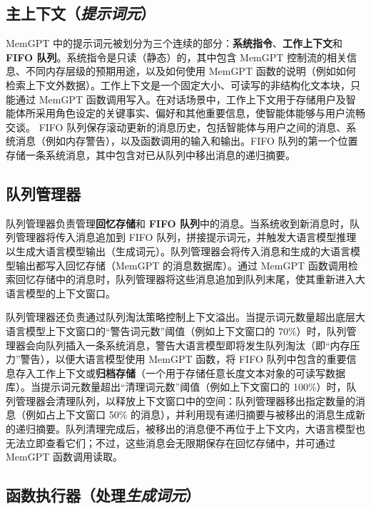 \documentclass[UTF8,fontset=fandol,a4paper,11pt]{ctexart}
\newcommand{\ours}{MemGPT\xspace}
\begin{document}
\subsection{主上下文（\emph{提示词元}）}

\ours 中的提示词元被划分为三个连续的部分：\textbf{系统指令}、\textbf{工作上下文}和 \textbf{FIFO 队列}。系统指令是只读（静态）的，其中包含 \ours 控制流的相关信息、不同内存层级的预期用途，以及如何使用 \ours 函数的说明（例如如何检索上下文外数据）。工作上下文是一个固定大小、可读写的非结构化文本块，只能通过 \ours 函数调用写入。在对话场景中，工作上下文用于存储用户及智能体所采用角色设定的关键事实、偏好和其他重要信息，使智能体能够与用户流畅交谈。
FIFO 队列保存滚动更新的消息历史，包括智能体与用户之间的消息、系统消息（例如内存警告），以及函数调用的输入和输出。FIFO 队列的第一个位置存储一条系统消息，其中包含对已从队列中移出消息的递归摘要。

\subsection{队列管理器}

队列管理器负责管理\textbf{回忆存储}和 \textbf{FIFO 队列}中的消息。当系统收到新消息时，队列管理器将传入消息追加到 FIFO 队列，拼接提示词元，并触发大语言模型推理以生成大语言模型输出（生成词元）。队列管理器会将传入消息和生成的大语言模型输出都写入回忆存储（\ours 的消息数据库）。通过 \ours 函数调用检索回忆存储中的消息时，队列管理器将这些消息追加到队列末尾，使其重新进入大语言模型的上下文窗口。

队列管理器还负责通过队列淘汰策略控制上下文溢出。当提示词元数量超出底层大语言模型上下文窗口的“警告词元数”阈值（例如上下文窗口的 70\%）时，队列管理器会向队列插入一条系统消息，警告大语言模型即将发生队列淘汰（即“内存压力”警告），以便大语言模型使用 \ours 函数，将 FIFO 队列中包含的重要信息存入工作上下文或\textbf{归档存储}（一个用于存储任意长度文本对象的可读写数据库）。当提示词元数量超出“清理词元数”阈值（例如上下文窗口的 100\%）时，队列管理器会清理队列，以释放上下文窗口中的空间：队列管理器移出指定数量的消息（例如占上下文窗口 50\% 的消息），并利用现有递归摘要与被移出的消息生成新的递归摘要。队列清理完成后，被移出的消息便不再位于上下文内，大语言模型也无法立即查看它们；不过，这些消息会无限期保存在回忆存储中，并可通过 \ours 函数调用读取。

\subsection{函数执行器（处理\emph{生成词元}）}
\end{document}
